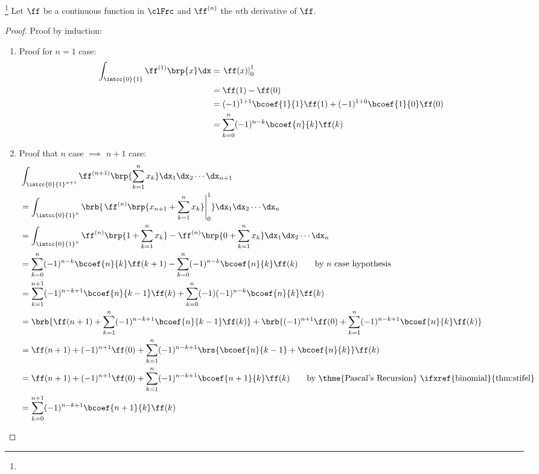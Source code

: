 \begin{theorem}
\footnote{
  }
\label{thm:int01}
Let $\ff$ be a continuous function in $\clFrc$ and $\ff^{(n)}$ the $n$th derivative of $\ff$.
\end{theorem}
\begin{proof}
Proof by induction:
  \begin{enumerate}
    \item Proof for $n=1$ case:
      \begin{align*}
        \int_\intcc{0}{1} \ff^{(1)}\brp{x} \dx
          &= \left.\ff(x)\right|_0^1
        \\&= \ff(1)-\ff(0)
        \\&= (-1)^{1+1}\bcoef{1}{1}\ff(1) + (-1)^{1+0}\bcoef{1}{0}\ff(0)
        \\&= \sum_{k=0}^n (-1)^{n-k}\bcoef{n}{k}\ff(k)
      \end{align*}

    \item Proof that $n$ case $\implies$ $n+1$ case:
      \begin{align*}
        &\int_{\intcc{0}{1}^{n+1}} \ff^{(n+1)}\brp{\sum_{k=1}^n x_k} \dx_1\dx_2\cdots\dx_{n+1}
        \\&= \int_{\intcc{0}{1}^n}\brb{\left. \ff^{(n)}\brp{x_{n+1}+\sum_{k=1}^n x_k}\right|_0^1} \dx_1\dx_2\cdots\dx_n
        \\&= \int_{\intcc{0}{1}^n}{\ff^{(n)}\brp{1+\sum_{k=1}^n x_k}-\ff^{(n)}\brp{0+\sum_{k=1}^n x_k}} \dx_1\dx_2\cdots\dx_n
        \\&= \sum_{k=0}^n (-1)^{n-k}\bcoef{n}{k}\ff(k+1) - \sum_{k=0}^n (-1)^{n-k}\bcoef{n}{k}\ff(k)
          \qquad\text{by $n$ case hypothesis}
        \\&= \sum_{k=1}^{n+1} (-1)^{n-k+1}\bcoef{n}{k-1}\ff(k) + \sum_{k=0}^n (-1)(-1)^{n-k}\bcoef{n}{k}\ff(k)
        \\&= \brb{ \ff(n+1)+ \sum_{k=1}^{n} (-1)^{n-k+1}\bcoef{n}{k-1}\ff(k) }
           + \brb{ (-1)^{n+1} \ff(0) + \sum_{k=1}^n (-1)^{n-k+1}\bcoef{n}{k}\ff(k)}
        \\&= \ff(n+1) + (-1)^{n+1}\ff(0) 
            + \sum_{k=1}^{n} (-1)^{n-k+1}\brs{\bcoef{n}{k-1}+\bcoef{n}{k}}\ff(k) 
        \\&= \ff(n+1) + (-1)^{n+1}\ff(0) 
            + \sum_{k=1}^{n} (-1)^{n-k+1}\bcoef{n+1}{k}\ff(k) 
          \qquad\text{by \thme{Pascal's Recursion} \ifxref{binomial}{thm:stifel}}
        \\&= \sum_{k=0}^{n+1} (-1)^{n-k+1}\bcoef{n+1}{k}\ff(k) 
      \end{align*}
  \end{enumerate}
\end{proof}


